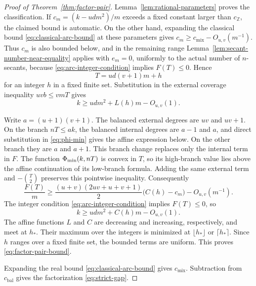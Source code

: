 \begin{proof}[Proof of Theorem~\ref{thm:factor-pair}]
Lemma~\ref{lem:rational-parameters} proves the classification.  If
\(c_m=(k-udm^2)/m\) exceeds a fixed constant larger than
\(c_{\mathbb Z}\), the claimed bound is automatic.
On the other hand, expanding the classical bound
\eqref{eq:classical-arc-bound} at these parameters gives
\(c_m\ge c_{\mathrm{mix}}-O_{u,v}(m^{-1})\).  Thus \(c_m\) is also bounded
below, and in the remaining range
Lemma~\ref{lem:secant-number-near-equality} applies with \(e_m=0\), uniformly
to the actual number of \(n\)-secants, because
\eqref{eq:arc-integer-condition} implies \(F(T)\le0\).  Hence
\[
 T=ud(v+1)m+h
\]
for an integer \(h\) in a fixed finite set.  Substitution in the external
coverage inequality \(uvb\le vmT\) gives
\begin{equation}\label{eq:coverage-linear}
 k\ge udm^2+L(h)m-O_{u,v}(1).
\end{equation}

Write \(a=(u+1)(v+1)\).  The balanced external degrees are \(uv\) and
\(uv+1\).  On the branch \(nT\le ak\), the balanced internal degrees are
\(a-1\) and \(a\), and direct substitution in \eqref{eq:phi-min} gives the
affine expression below.  On the other branch they are \(a\) and \(a+1\).
This branch change replaces only the internal term in \(F\).
The function \(\Phi_{\min}(k,nT)\) is convex in \(T\), so its high-branch value
lies above the affine continuation of its low-branch formula.  Adding the
same external term and \(-\binom{T}{2}\) preserves this pointwise inequality.
Consequently
\begin{equation}\label{eq:pair-linear}
 \frac{F(T)}m
 \ge\frac{(u+v)(2uv+u+v+1)}2\bigl(C(h)-c_m\bigr)
   -O_{u,v}(m^{-1}).
\end{equation}
The integer condition \eqref{eq:arc-integer-condition} implies \(F(T)\le0\),
so
\[
 k\ge udm^2+C(h)m-O_{u,v}(1).
\]
The affine functions \(L\) and \(C\) are decreasing and increasing,
respectively, and meet at \(h_*\).  Their maximum over the integers is
minimized at \(\lfloor h_*\rfloor\) or \(\lceil h_*\rceil\).  Since \(h\)
ranges over a fixed finite set, the bounded terms are uniform.  This proves
\eqref{eq:factor-pair-bound}.

Expanding the real bound \eqref{eq:classical-arc-bound} gives
\(c_{\mathrm{mix}}\).  Subtraction from \(c_{\mathrm{bal}}\) gives the
factorization \eqref{eq:strict-gap}.
\end{proof}


